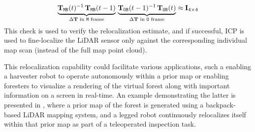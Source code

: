\begin{equation}
  \label{eq:cycle-relocalization}
  \underbrace{\mathbf{T}_{\mathtt{M}\mathtt{B}}(t)^{-1}\, \mathbf{T}_{\mathtt{M}\mathtt{B}}(t-1)}_{\Delta\mathbf{T} \text{ in $\mathtt{M}$ frame}}  \, \underbrace{ \mathbf{T}_{\mathtt{O}\mathtt{B}}(t-1)^{-1}\,  \mathbf{T}_{\mathtt{O}\mathtt{B}}(t)}_{\Delta\mathbf{T} \text{ in $\mathtt{O}$ frame}} \approx \mathbf{I}_{4\times4}
\end{equation}
This check is used to verify the relocalization estimate, and if successful, ICP is used to fine-localize the LiDAR sensor only against the corresponding individual map scan (instead of the full map point cloud).


This relocalization capability could facilitate various applications, such a enabling a harvester robot to operate autonomously within a prior map or enabling foresters to visualize a rendering of the virtual forest along with important information on a screen in real-time. An example demonstrating the latter is presented in , where a prior map of the forest is generated using a backpack-based LiDAR mapping system, and a legged robot continuously relocalizes itself within that prior map as part of a teleoperated inspection task.
